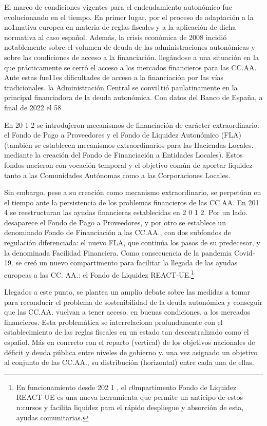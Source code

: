 \documentclass[10pt,a4paper]{article}
\begin{document}
{El marco de condiciones vigentes para el endeudamiento autonómico fue evolucionando en el tiempo. En primer lugar, por el proceso de adaptación a la no1mativa europea en materia de reglas fiscales y a la aplicación de dicha normativa al caso español. Además, la crisis económica de 2008 incidió notablemente sobre el volumen de deuda de las administraciones autonómicas y sobre las condiciones de acceso a la financiación. llegándose a una situación en la que prácticamente se cerró el acceso a los mercados financieros para las CC.AA. Ante estas fue11es dificultades de acceso a la financiación por las vías tradicionales. la Administración Central se convi1tió paulatinamente en la principal financiadora de la deuda autonómica. Con datos del Banco de España, a final de 2022 el 58%

En 20 1 2 se introdujeron mecanismos de financiación de carácter extraordinario: el Fondo de Pago a Proveedores y el Fondo de Liquidez Autonómico (FLA) (también se establecen mecanismos extraordinarios para las Haciendas Locales. mediante la creación del Fondo de Financiación a Entidades Locales). Estos fondos nacieron con vocación temporal y el objetivo común de aportar liquidez tanto a las Comunidades Autónomas como a las Corporaciones Locales.

Sin embargo. pese a su creación como mecanismo extraordinario, se perpetúan en el tiempo ante la persistencia de los problemas financieros de las CC.AA. En 201 4 se reestructuran las ayudas financieras establecidas en 2 0 1 2. Por un lado. desaparece el Fondo de Pago a Proveedores, y por otro se establece un denominado Fondo de Financiación a las CC.AA., con dos subfondos de regulación diferenciada: el nuevo FLA, que continúa los pasos de su predecesor, y la denominada Facilidad Financiera. Como consecuencia de la pandemia Covid- 19. se creó un nuevo compartimento para facilitar la llegada de las ayudas europeas a las CC. AA.: el Fondo de Liquidez REACT-UE.\footnote{%
    En funcionamiento desde 202 1 , el c0mpartimento Fondo de Liquidez REACT-UE es una nueva herramienta que permite un anticipo de estos n:cursos y facilita liquidez para el rápido despliegue y absorción de esta, ayudas comunitarias.
} 

Llegados a este punto, se plantea un amplio debate sobre las medidas a tomar para reconducir el problema de sostenibilidad de la deuda autonómica y conseguir que las CC.AA. vuelvan a tener acceso. en buenas condiciones, a los mercados financieros. Esta problemática se interrelaciona profundamente con el establecimiento de las reglas fiscales en un estado tan descentralizado como el espafiol. Más en concreto con el reparto (vertical) de los objetivos nacionales de déficit y deuda pública entre niveles de gobierno y. una vez asignado un objetivo al conjunto de las CC.AA., su distribución (horizontal) entre cada una de ellas.

}
\end{document}
